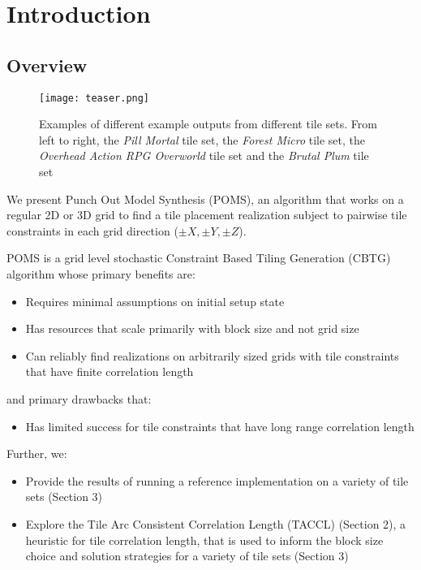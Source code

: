\section{Introduction}

\subsection{Overview}

\begin{figure*}[ht]
  \texttt{[image: teaser.png]}
  \caption{Examples of different example outputs from different tile sets. From left to right, the \textit{Pill Mortal} tile set, the \textit{Forest Micro} tile set, the \textit{Overhead Action RPG Overworld} tile set and the \textit{Brutal Plum} tile set}
  \label{fig:teaser}
\end{figure*}

We present Punch Out Model Synthesis (POMS), an algorithm that works on a regular 2D or 3D
grid to find a tile placement realization subject to pairwise tile constraints in each grid direction
($\pm X, \pm Y, \pm Z$).

POMS is a grid level stochastic Constraint Based Tiling Generation (CBTG) algorithm whose primary benefits are:

\begin{itemize}
  \item Requires minimal assumptions on initial setup state
  \item Has resources that scale primarily with block size and not grid size
  \item Can reliably find realizations on arbitrarily sized grids with tile constraints that have finite correlation length
\end{itemize}

and primary drawbacks that:

\begin{itemize}
  \item Has limited success for tile constraints that have long range correlation length
\end{itemize}

Further, we:

\begin{itemize}
  \item Provide the results of running a reference implementation on a variety of tile sets (Section 3)
  \item Explore the Tile Arc Consistent Correlation Length (TACCL) (Section 2), a heuristic for tile correlation length,
        that is used to inform the block size choice and solution strategies for a variety of tile sets (Section 3)
\end{itemize}

